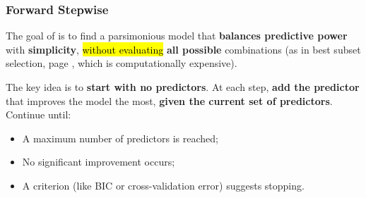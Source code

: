 \subsubsection{Forward Stepwise}\label{subsubsection: Forward Stepwise}

The goal of  is to find a parsimonious model that \textbf{balances predictive power} with \textbf{simplicity}, \hl{without evaluating} \textbf{all possible} combinations (as in best subset selection, page \pageref{subsubsection: Best Subset Selection}, which is computationally expensive).

\highspace
The key idea is to \textbf{start with no predictors}. At each step, \textbf{add the predictor} that improves the model the most, \textbf{given the current set of predictors}. Continue until:
\begin{itemize}
    \item A maximum number of predictors is reached;
    \item No significant improvement occurs;
    \item A criterion (like BIC or cross-validation error) suggests stopping.
\end{itemize}

